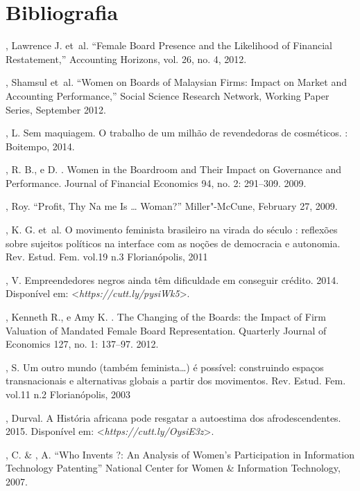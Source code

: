 \chapter{Bibliografia}

\begin{Parskip}
, Lawrence J. et~al. ``Female Board Presence and the Likelihood
of Financial Restatement,'' Accounting Horizons, vol. 26, no. 4, 2012.

, Shamsul et~al. ``Women on Boards of Malaysian Firms: Impact
on Market and Accounting Performance,'' Social Science Research Network,
Working Paper Series, September 2012.

, L. Sem maquiagem. O trabalho de um milhão de revendedoras de
cosméticos. : Boitempo, 2014.

, R. B., e D. . Women in the Boardroom and Their Impact on
Governance and Performance. Journal of Financial Economics 94, no. 2:
291--309. 2009.

, Roy. ``Profit, Thy Na me Is \ldots{} Woman?'' Miller"-McCune,
February 27, 2009.

, K. G. et~al. O movimento feminista brasileiro na virada do
século : reflexões sobre sujeitos políticos na interface com as noções
de democracia e autonomia. Rev. Estud. Fem. vol.19 n.3 Florianópolis,
2011

, V. Empreendedores negros ainda têm dificuldade em conseguir
crédito. 2014.
Disponível em: \textless\emph{https://cutt.ly/pysiWk5}\textgreater{}.

, Kenneth R., e Amy K. . The Changing of the Boards: the
Impact of Firm Valuation of Mandated Female Board Representation.
Quarterly Journal of Economics 127, no. 1: 137--97. 2012.

, S. Um outro mundo (também feminista\ldots{}) é possível: construindo
espaços transnacionais e alternativas globais a partir dos movimentos.
Rev. Estud. Fem. vol.11 n.2 Florianópolis, 2003

, Durval. A História africana pode resgatar a autoestima dos
afrodescendentes. 2015.
Disponível em: \textless{}\emph{https://cutt.ly/OysiE3z}\textgreater{}.

, C. \& , A. ``Who Invents ?: An Analysis of Women's
Participation in Information Technology Patenting'' National Center for
Women \& Information Technology, 2007.


\end{Parskip}
